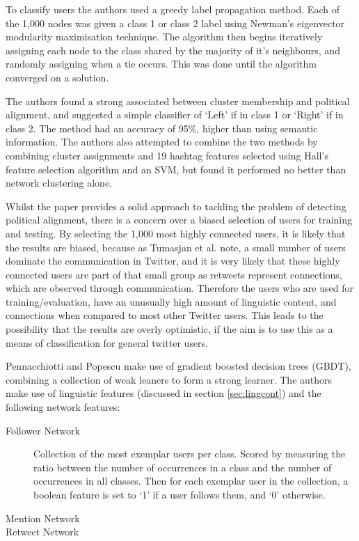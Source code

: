 \documentclass[bsc,frontabs,singlespacing,parskip]{infthesis}     %
\begin{document}
To classify users the authors used a greedy label propagation method. Each of the 1,000 nodes was given a class 1 or class 2  label using Newman's eigenvector modularity maximisation technique. The algorithm then begins iteratively assigning each node to the class shared by the majority of it's neighbours, and randomly assigning when a tie occurs. This was done until the algorithm converged on a solution. 

The authors found a strong associated between cluster membership and political alignment, and suggested a simple classifier of `Left' if in class 1 or `Right' if in class 2. The method had an accuracy of 95\%, higher than using semantic information. The authors also attempted to combine the two methods by combining cluster assignments and 19 hashtag features selected using Hall's feature selection algorithm and an SVM, but found it performed no better than network clustering alone. 

Whilst the paper provides a solid approach to tackling the problem of detecting political alignment, there is a concern over a biased selection of users for training and testing. By selecting the 1,000 most highly connected users, it is likely that the results are biased, because as Tumasjan et al. \cite{predelections} note, a small number of users dominate the communication in Twitter, and it is very likely that these highly connected users are part of that small group as retweets represent connections, which are observed through communication. Therefore the users who are used for training/evaluation, have an unusually high amount of linguistic content, and connections when compared to most other Twitter users. This leads to the possibility that the results are overly optimistic, if the aim is to use this as a means of classification for general twitter users. 

Pennacchiotti and Popescu \cite{yahoopaper} make use of gradient boosted decision trees (GBDT), combining a collection of weak leaners to form a strong learner. The authors make use of linguistic features (discussed in section \ref{sec:lingcont}) and the following network features:

\begin{description}
\item[Follower Network] Collection of the most exemplar users per class. Scored by measuring the ratio between the number of occurrences in a class and the number of occurrences in all classes. Then for each exemplar user in the collection, a boolean feature is set to `1' if a user follows them, and `0' otherwise.

\item[Mention Network] 
\item[Retweet Network]
\end{description}
\end{document}
